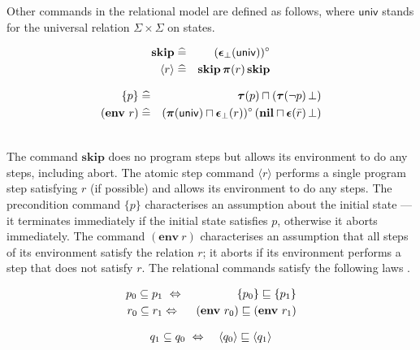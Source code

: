 \documentclass[fleqn]{fac}
\newcommand{\labelproperty}[1]{\label{property-#1}\index{Property!#1|PropertyDef{\ref{property-#1}}}}
\newcommand{\Pre}[1]{\{#1\}}
\newcommand{\SSeq}{\,}
\newcommand{\atomicrel}[1]{\langle#1\rangle}
\newcommand{\Nil}{\Keyword{nil}}
\newcommand{\sdefs}{\mathrel{\widehat=}}\newcommand{\spot}{\mathrel{{\cdot}}}\newcommand{\where}{\mathrel{|}}\renewcommand{\implies}{\mathrel{\Rightarrow}}\newcommand{\emptyrel}{\emptyset}
\newcommand{\universalrel}{\mathsf{univ}}
\newcommand{\relcontained}{\subseteq}
\renewcommand{\iff}{\mathrel{\Leftrightarrow}}
\newcommand{\nondet}{\mathbin{\sqcap}}
\newcommand{\Env}{\Keyword{env}}
\newcommand{\envc}[1]{(\Env~#1)}
\newcommand{\Keyword}[1]{\mathsf{\mathbf{#1}}}
\newcommand{\Abort}{\Keyword{\bot}}
\newcommand{\botstate}{\bot}
\newcommand{\FinOrInfIter}{^{\circ}}
\newcommand{\cpstepd}{\boldsymbol{\pi}}
\newcommand{\cestepd}{\boldsymbol{\epsilon}}
\newcommand{\cestepbotd}{\cestepd_{\botstate}}
\newcommand{\cpstep}[1]{\cpstepd(#1)}
\newcommand{\cestep}[1]{\cestepd(#1)}
\newcommand{\cestepbot}[1]{\cestepbotd(#1)}
\newcommand{\cgdd}{\boldsymbol{\tau}}
\newcommand{\cgd}[1]{\cgdd(#1)}
\newcommand{\Skip}{\Keyword{skip}}
\begin{document}
Other commands in the relational model are defined as follows,
where $\universalrel$ stands for the universal relation $\Sigma \times \Sigma$ on states.
\vspace*{-2ex}\\
\begin{minipage}[t]{0.5\textwidth}
\begin{eqnarray}
  \Skip & \sdefs & (\cestepbot{\universalrel})\FinOrInfIter  \labelproperty{semantics-skip} \\
  \atomicrel{r} & \sdefs & \Skip \SSeq \cpstep{r} \SSeq \Skip  \labelproperty{semantics-atomicrel} 
\end{eqnarray}
\end{minipage}
\begin{minipage}[t]{0.49\textwidth}
\begin{eqnarray}
  \Pre{p} & \sdefs & \cgd{p} \nondet (\cgd{\lnot p} \SSeq \Abort)  \labelproperty{semantics-precondition} \\
  \envc{r} & \sdefs & (\cpstep{\universalrel} \nondet \cestepbot{r})\FinOrInfIter \SSeq (\Nil \nondet \cestep{\bar{r}} \SSeq \Abort) \labelproperty{semantics-env}
\end{eqnarray}
\end{minipage}\vspace*{1ex}\\
The command 
$\Skip$ does no program steps but allows its environment to do any steps, including abort.
The atomic step command $\atomicrel{r}$ performs a single program step satisfying $r$ (if possible) and allows its environment to do any steps.
The precondition command $\Pre{p}$ characterises an assumption about the initial state --- 
it terminates immediately if the initial state satisfies $p$, otherwise it aborts immediately.
The command $\envc{r}$ characterises an assumption that all steps of its environment satisfy the relation $r$;
it aborts if its environment performs a step that does not satisfy $r$.
The relational commands satisfy the following laws \cite{HayesJonesColvin14TR}.\\
\begin{minipage}[t]{0.5\textwidth}
\begin{eqnarray}
  p_0 \relcontained p_1 & ~\iff~ & \Pre{p_0} \refsto \Pre{p_1} 
    \labelproperty{weaken-precondition} \\
  r_0 \relcontained r_1 & \iff & \envc{r_0} \refsto \envc{r_1}
    \labelproperty{weaken-environment}
\end{eqnarray}
\end{minipage}
\begin{minipage}[t]{0.49\textwidth}
\begin{eqnarray}
  q_1 \relcontained q_0 & ~\iff~ & \atomicrel{q_0} \refsto \atomicrel{q_1}
    \labelproperty{strengthen-postcondition-atomic} 
\end{eqnarray}
\end{minipage}
\vspace{1ex}
\end{document}
